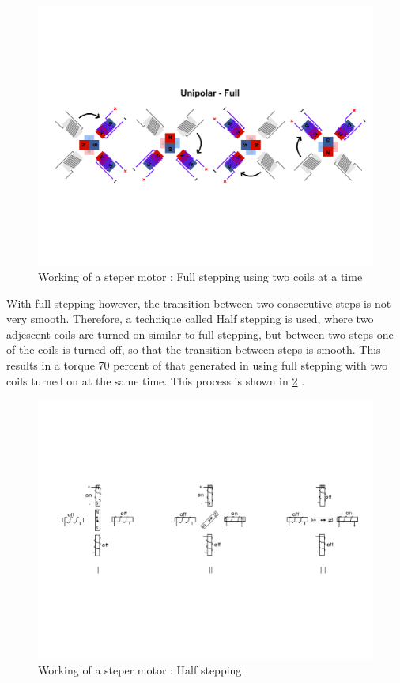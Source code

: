 \documentclass[sigconf]{acmart}
\begin{document}
\begin{figure}[!ht]
  \centering\includegraphics[width=\columnwidth]{images/stepper2.pdf}
  \caption{Working of a steper motor : Full stepping using two coils at a time \cite{stepper2}}\label{f:stepper2}
\end{figure}

With full stepping however, the transition between two consecutive steps is not very smooth. Therefore, a technique called Half stepping is used, where two adjescent coils are turned on similar to full stepping, but between two steps one of the coils is turned off, so that the transition between steps is smooth. This results in a torque 70 percent of that generated in using full stepping with two coils turned on at the same time. This process is shown in \ref{f:stepper3} \cite{stepper1}.

\begin{figure}[!ht]
  \centering\includegraphics[width=\columnwidth]{images/stepper3.pdf}
  \caption{Working of a steper motor : Half stepping \cite{stepper1}}\label{f:stepper3}
\end{figure}
\end{document}
